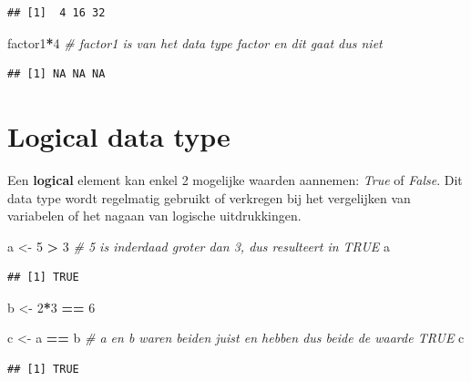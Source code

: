 \documentclass[
]{book}
\newenvironment{Shaded}{\begin{snugshade}}{\end{snugshade}}
\newcommand{\CommentTok}[1]{\textcolor[rgb]{0.56,0.35,0.01}{\textit{#1}}}
\newcommand{\DecValTok}[1]{\textcolor[rgb]{0.00,0.00,0.81}{#1}}
\newcommand{\NormalTok}[1]{#1}
\newcommand{\OtherTok}[1]{\textcolor[rgb]{0.56,0.35,0.01}{#1}}
\newcommand{\SpecialCharTok}[1]{\textcolor[rgb]{0.81,0.36,0.00}{\textbf{#1}}}
\begin{document}
\begin{verbatim}
## [1]  4 16 32
\end{verbatim}

\begin{Shaded}
\begin{Highlighting}[]
\NormalTok{factor1}\SpecialCharTok{*}\DecValTok{4} \CommentTok{\# factor1 is van het data type factor en dit gaat dus niet}
\end{Highlighting}
\end{Shaded}

\begin{verbatim}
## [1] NA NA NA
\end{verbatim}

\hypertarget{logical-data-type}{%
\section{Logical data type}\label{logical-data-type}}

Een \textbf{logical} element kan enkel 2 mogelijke waarden aannemen: \emph{True} of \emph{False}. Dit data type wordt regelmatig gebruikt of verkregen bij het vergelijken van variabelen of het nagaan van logische uitdrukkingen.

\begin{Shaded}
\begin{Highlighting}[]
\NormalTok{a }\OtherTok{\textless{}{-}} \DecValTok{5} \SpecialCharTok{\textgreater{}} \DecValTok{3} \CommentTok{\# 5 is inderdaad groter dan 3, dus resulteert in \textquotesingle{}TRUE\textquotesingle{}}
\NormalTok{a}
\end{Highlighting}
\end{Shaded}

\begin{verbatim}
## [1] TRUE
\end{verbatim}

\begin{Shaded}
\begin{Highlighting}[]
\NormalTok{b }\OtherTok{\textless{}{-}} \DecValTok{2}\SpecialCharTok{*}\DecValTok{3} \SpecialCharTok{==} \DecValTok{6}

\NormalTok{c }\OtherTok{\textless{}{-}}\NormalTok{ a }\SpecialCharTok{==}\NormalTok{ b }\CommentTok{\# a en b waren beiden juist en hebben dus beide de waarde \textquotesingle{}TRUE\textquotesingle{}}
\NormalTok{c}
\end{Highlighting}
\end{Shaded}

\begin{verbatim}
## [1] TRUE
\end{verbatim}
\end{document}
